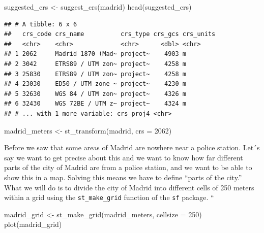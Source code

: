 \documentclass[
  krantz2]{krantz}
\makeatletter
\newenvironment{Shaded}{\begin{snugshade}}{\end{snugshade}}
\newcommand{\AttributeTok}[1]{\textcolor[rgb]{0.61,0.61,0.61}{#1}}
\newcommand{\DecValTok}[1]{\textcolor[rgb]{0.06,0.06,0.06}{#1}}
\newcommand{\FunctionTok}[1]{\textcolor[rgb]{0,0,0}{#1}}
\newcommand{\NormalTok}[1]{#1}
\newcommand{\OtherTok}[1]{\textcolor[rgb]{0.37,0.37,0.37}{#1}}
\newenvironment{kframe}{%
\medskip{}
\setlength{\fboxsep}{.8em}
 \def\at@end@of@kframe{}%
 \ifinner\ifhmode%
  \def\at@end@of@kframe{\end{minipage}}%
  \begin{minipage}{\columnwidth}%
 \fi\fi%
 \def\FrameCommand##1{\hskip\@totalleftmargin \hskip-\fboxsep
 \colorbox{shadecolor}{##1}\hskip-\fboxsep
     \hskip-\linewidth \hskip-\@totalleftmargin \hskip\columnwidth}%
 \MakeFramed {\advance\hsize-\width
   \@totalleftmargin\z@ \linewidth\hsize
   \@setminipage}}%
 {\par\unskip\endMakeFramed%
 \at@end@of@kframe}
\renewenvironment{Shaded}{\begin{kframe}}{\end{kframe}}
\makeatother
\begin{document}
\begin{Shaded}
\begin{Highlighting}[]
\NormalTok{suggested\_crs }\OtherTok{\textless{}{-}} \FunctionTok{suggest\_crs}\NormalTok{(madrid)}
\FunctionTok{head}\NormalTok{(suggested\_crs)}
\end{Highlighting}
\end{Shaded}

\begin{verbatim}
## # A tibble: 6 x 6
##   crs_code crs_name          crs_type crs_gcs crs_units
##   <chr>    <chr>             <chr>      <dbl> <chr>    
## 1 2062     Madrid 1870 (Mad~ project~    4903 m        
## 2 3042     ETRS89 / UTM zon~ project~    4258 m        
## 3 25830    ETRS89 / UTM zon~ project~    4258 m        
## 4 23030    ED50 / UTM zone ~ project~    4230 m        
## 5 32630    WGS 84 / UTM zon~ project~    4326 m        
## 6 32430    WGS 72BE / UTM z~ project~    4324 m        
## # ... with 1 more variable: crs_proj4 <chr>
\end{verbatim}

\begin{Shaded}
\begin{Highlighting}[]
\NormalTok{madrid\_meters }\OtherTok{\textless{}{-}} \FunctionTok{st\_transform}\NormalTok{(madrid, }\AttributeTok{crs =} \DecValTok{2062}\NormalTok{)}
\end{Highlighting}
\end{Shaded}

Before we saw that some areas of Madrid are nowhere near a police station. Let´s say we want to get precise about this and we want to know how far different parts of the city of Madrid are from a police station, and we want to be able to show this in a map. Solving this means we have to define ``parts of the city.'' What we will do is to divide the city of Madrid into different cells of 250 meters within a grid using the \texttt{st\_make\_grid} function of the \texttt{sf} package.
``

\begin{Shaded}
\begin{Highlighting}[]
\NormalTok{madrid\_grid }\OtherTok{\textless{}{-}} \FunctionTok{st\_make\_grid}\NormalTok{(madrid\_meters,  }\AttributeTok{cellsize =} \DecValTok{250}\NormalTok{)}
\FunctionTok{plot}\NormalTok{(madrid\_grid)}
\end{Highlighting}
\end{Shaded}
\end{document}
